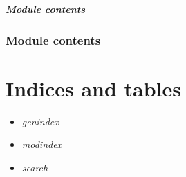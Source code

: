\documentclass[letterpaper,10pt,english]{sphinxmanual}
\begin{document}

\begin{fulllineitems}
\label{webServices.wsGanados:webServices.wsGanados.views.wsWormer_view}
\end{fulllineitems}



\paragraph{Module contents}
\label{webServices.wsGanados:module-webServices.wsGanados}\label{webServices.wsGanados:module-contents}

\subsection{Module contents}
\label{webServices:module-webServices}\label{webServices:module-contents}

\chapter{Indices and tables}
\label{index:indices-and-tables}\begin{itemize}
\item {} 
\emph{genindex}

\item {} 
\emph{modindex}

\item {} 
\emph{search}

\end{itemize}
\end{document}

